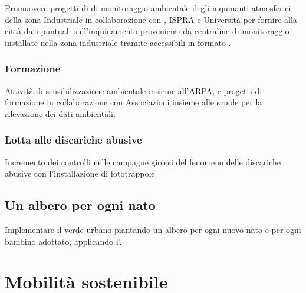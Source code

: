 \documentclass[a4paper,14pt,italian]{sphinxmanual}
\begin{document}

Promuovere progetti di di monitoraggio ambientale degli inquinanti atmosferici della zona Industriale in collaborazione con , ISPRA e Università per fornire alla città dati puntuali sull’inquinamento provenienti da centraline di monitoraggio installate nella zona industriale tramite  accessibili in formato .


\subsection{Formazione}
\label{\detokenize{ambiente:formazione}}
Attività di sensibilizzazione ambientale insieme all’ARPA, e progetti di formazione in collaborazione con Associazioni insieme alle scuole per la rilevazione dei dati ambientali.


\subsection{Lotta alle discariche abusive}
\label{\detokenize{ambiente:lotta-alle-discariche-abusive}}
Incremento dei controlli nelle campagne gioiesi del fenomeno delle discariche abusive con l’installazione di fototrappole.


\section{Un albero per ogni nato}
\label{\detokenize{ambiente:un-albero-per-ogni-nato}}
Implementare il verde urbano piantando un albero per ogni nuovo nato e per ogni bambino adottato, applicando l’.


\chapter{Mobilità sostenibile}
\label{\detokenize{mobilita:mobilita-sostenibile}}\label{\detokenize{mobilita::doc}}
\end{document}
